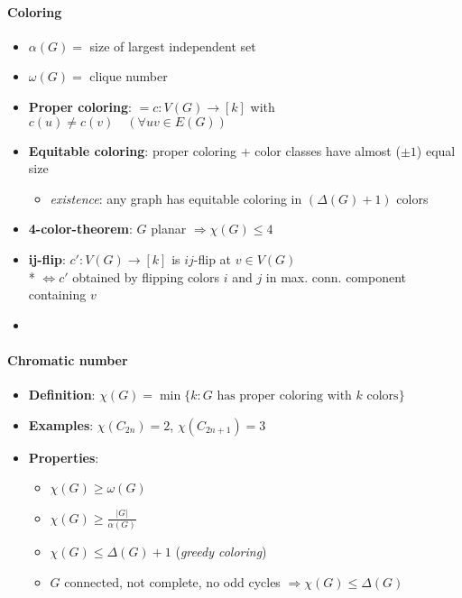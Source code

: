 \paragraph{Coloring}
\begin{itemize}
  \item $ \alpha(G) = $ size of largest independent set
  \item $ \omega(G) = $ clique number
  \item \textbf{Proper coloring}: $ = c : V(G) \to [k] $ with $ c(u) \neq c(v) \quad (\forall uv \in E(G)) $
  \item \textbf{Equitable coloring}: proper coloring + color classes have almost ($ \pm 1 $) equal size
  \begin{itemize}
    \item \emph{existence}: any graph has equitable coloring in $ (\Delta(G) + 1) $ colors 
  \end{itemize}
  \item \textbf{4-color-theorem}: $ G $ planar $ \Rightarrow \chi(G) \leq 4 $ 
  \item \textbf{ij-flip}: $ c': V(G) \to [k] $ is $ ij $-flip at $ v \in V(G) $ \\*
    $ \Leftrightarrow c' $ obtained by flipping colors $ i $ and $ j $ in max. conn. component containing $ v $
  \item 
\end{itemize}

\paragraph{Chromatic number}
\begin{itemize}
  \item \textbf{Definition}: $ \chi(G) = \min\{ k: G \text{ has proper coloring with } k \text{ colors} \} $ 
  \item \textbf{Examples}: $ \chi(C_{2n}) = 2 $, $ \chi(C_{2n+1}) = 3 $
  \item \textbf{Properties}:
  \begin{itemize}
    \item $ \chi(G) \geq \omega(G) $ 
    \item $ \chi(G) \geq \frac{\vert G \vert}{\alpha(G)} $
    \item $ \chi(G) \leq \Delta(G) + 1 $ (\emph{greedy coloring})
    \item $ G $ connected, not complete, no odd cycles $ \Rightarrow \chi(G) \leq \Delta(G) $
  \end{itemize}
\end{itemize}


